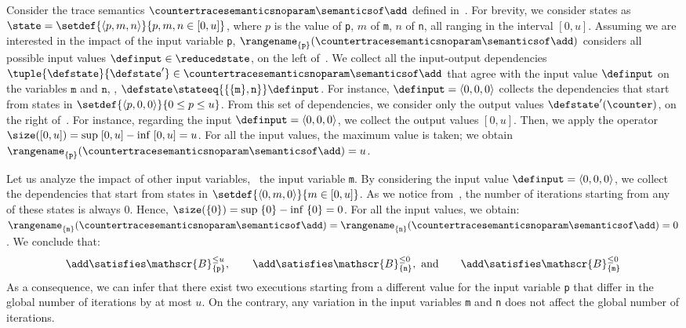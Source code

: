 \begin{example}
  Consider the trace semantics $\countertracesemanticsnoparam\semanticsof\add$ defined in~.
  For brevity, we consider states as $\state = \setdef{\langle p, m, n\rangle}{p, m, n\in[0, u]}$,
  where $p$ is the value of \texttt{p}, $m$ of \texttt{m}, $n$ of \texttt{n}, all ranging in the interval $[0, u]$.
  Assuming we are interested in the impact of the input variable \texttt{p}, $\rangename_{\{\texttt{p}\}}(\countertracesemanticsnoparam\semanticsof\add)$ considers all possible input values $\definput\in\reducedstate$, on the left of~.
  We collect all the input-output dependencies $\tuple{\defstate}{\defstate'}\in\countertracesemanticsnoparam\semanticsof\add$ that agree with the input value $\definput$ on the variables $\texttt{m}$ and $\texttt{n}$, \ie, $\defstate\stateeq{\{\{\texttt{m}\},\texttt{n}\}}\definput$.
  For instance, $\definput = \langle 0, 0, 0\rangle$ collects the dependencies that start from states in $\setdef{\langle p, 0, 0\rangle}{0 \le p \le u}$.
  From this set of dependencies, we consider only the output values $\defstate'(\counter)$, on the right of~.
  For instance, regarding the input $\definput = \langle 0, 0, 0\rangle$, we collect the output values $[0, u]$.
  Then, we apply the operator $\size([0, u]) = \sup\; [0, u] - \inf\; [0, u] = u$.
  For all the input values, the maximum value is taken; we obtain $\rangename_{\{\texttt{p}\}}(\countertracesemanticsnoparam\semanticsof\add)= u$.


  Let us analyze the impact of other input variables, \eg~the input variable \texttt{m}.
  By considering the input value $\definput = \langle 0, 0, 0\rangle$, we collect the dependencies that start from states in $\setdef{\langle 0, m, 0\rangle}{m\in[0, u]}$. As we notice from~, the number of iterations starting from any of these states is always $0$.
  Hence, $\size(\{0\}) = \sup\; \{0\} - \inf\; \{0\} = 0$.
  For all the input values, we obtain: $\rangename_{\{\texttt{m}\}}(\countertracesemanticsnoparam\semanticsof\add)=\rangename_{\{\texttt{n}\}}(\countertracesemanticsnoparam\semanticsof\add)=0$.
%
  We conclude that:
  \[ \add \satisfies \mathscr{B}^{\le u}_{\{\texttt{p}\}}, \qquad \add \satisfies \mathscr{B}^{\le 0}_{\{\texttt{n}\}},\text{ and} \qquad \add \satisfies \mathscr{B}^{\le 0}_{\{\texttt{m}\}}\]
  As a consequence, we can infer that there exist two executions starting from a different value for the input variable \texttt{p} that differ in the global number of iterations by at most $u$. On the contrary, any variation in the input variables \texttt{m} and \texttt{n} does not affect the global number of iterations.
\end{example}


